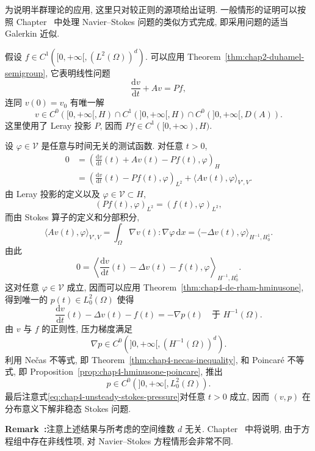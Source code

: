 \begin{Proof}
为说明半群理论的应用, 这里只对较正则的源项给出证明. 一般情形的证明可以按照 Chapter~ 中处理 Navier--Stokes 问题的类似方式完成, 即采用问题的适当 Galerkin 近似.

假设 $f\in C^1([0,+\infty[,(L^2(\Omega))^d)$. 可以应用 Theorem~\ref{thm:chap2-duhamel-semigroup}, 它表明线性问题
\[
 \frac{\mathrm dv}{\mathrm dt}+Av=Pf,
\]
连同 $v(0)=v_0$ 有唯一解
\[
 v\in C^0([0,+\infty[,H)\cap C^1(]0,+\infty[,H)
 \cap C^0(]0,+\infty[,D(A)).
\]
这里使用了 Leray 投影 $P$, 因而 $Pf\in C^1([0,+\infty),H)$.

设 $\varphi\in\mathcal V$ 是任意与时间无关的测试函数. 对任意 $t>0$,
\[
 \begin{aligned}
 0
 &=\left(\frac{\mathrm dv}{\mathrm dt}(t)+Av(t)-Pf(t),\varphi\right)_H\\
 &=\left(\frac{\mathrm dv}{\mathrm dt}(t)-Pf(t),\varphi\right)_{L^2}
 +\langle Av(t),\varphi\rangle_{V',V}.
 \end{aligned}
\]
由 Leray 投影的定义以及 $\varphi\in\mathcal V\subset H$,
\[
 (Pf(t),\varphi)_{L^2}=(f(t),\varphi)_{L^2},
\]
而由 Stokes 算子的定义和分部积分,
\[
 \langle Av(t),\varphi\rangle_{V',V}
 =\int_\Omega\nabla v(t):\nabla\varphi\,\mathrm dx
 =\langle-\Delta v(t),\varphi\rangle_{H^{-1},H_0^1}.
\]
由此
\[
 0=\left\langle\frac{\mathrm dv}{\mathrm dt}(t)-\Delta v(t)-f(t),
 \varphi\right\rangle_{H^{-1},H_0^1}.
\]
这对任意 $\varphi\in\mathcal V$ 成立, 因而可以应用 Theorem~\ref{thm:chap4-de-rham-hminusone}, 得到唯一的 $p(t)\in L_0^2(\Omega)$ 使得
\begin{equation}
 \frac{\mathrm dv}{\mathrm dt}(t)-\Delta v(t)-f(t)=-\nabla p(t)
 \quad\text{于 }H^{-1}(\Omega).
 \label{eq:chap4-unsteady-stokes-pressure}
\end{equation}
由 $v$ 与 $f$ 的正则性, 压力梯度满足
\[
 \nabla p\in C^0(]0,+\infty[,(H^{-1}(\Omega))^d).
\]
利用 Nečas 不等式, 即 Theorem~\ref{thm:chap4-necas-inequality}, 和 Poincaré 不等式, 即 Proposition~\ref{prop:chap4-hminusone-poincare}, 推出
\[
 p\in C^0(]0,+\infty[,L_0^2(\Omega)).
\]
最后注意式\eqref{eq:chap4-unsteady-stokes-pressure}对任意 $t>0$ 成立, 因而 $(v,p)$ 在分布意义下解非稳态 Stokes 问题.
\end{Proof}

\par\noindent{}\textbf{Remark~\thechapterfoursectionfiveremark:}\label{rem:chap4-unsteady-stokes-dimension-independent}\quad 注意上述结果与所考虑的空间维数 $d$ 无关. Chapter~ 中将说明, 由于方程组中存在非线性项, 对 Navier--Stokes 方程情形会非常不同.

